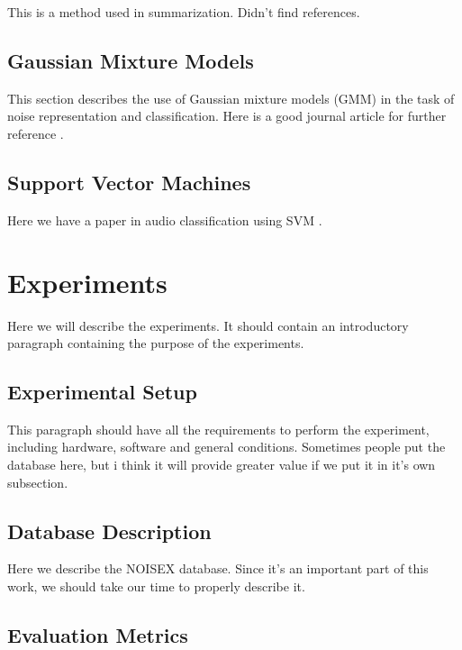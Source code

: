 \documentclass[12pt]{article}
\begin{document}
This is a method used in summarization. Didn't find references.

\subsection{Gaussian Mixture Models} \label{class:gmm}

This section describes the use of Gaussian mixture models (GMM) in the task of noise representation and classification. Here is a good journal article for further reference \cite{reynolds1995robust}.


\subsection{Support Vector Machines} \label{class:svm}

Here we have a paper in audio classification using SVM \cite{cumani2012analysis}.



\section{Experiments} \label{exp}

Here we will describe the experiments. It should contain an introductory paragraph containing the purpose of the experiments.

\subsection{Experimental Setup} \label{exp:setup}

This paragraph should have all the requirements to perform the experiment, including hardware, software and general conditions. Sometimes people put the database here, but i think it will provide greater value if we put it in it's own subsection.

\subsection{Database Description} \label{exp:data}

Here we describe the NOISEX database. Since it's an important part of this work, we should take our time to properly describe it.

\subsection{Evaluation Metrics} \label{exp:metric}
\end{document}
